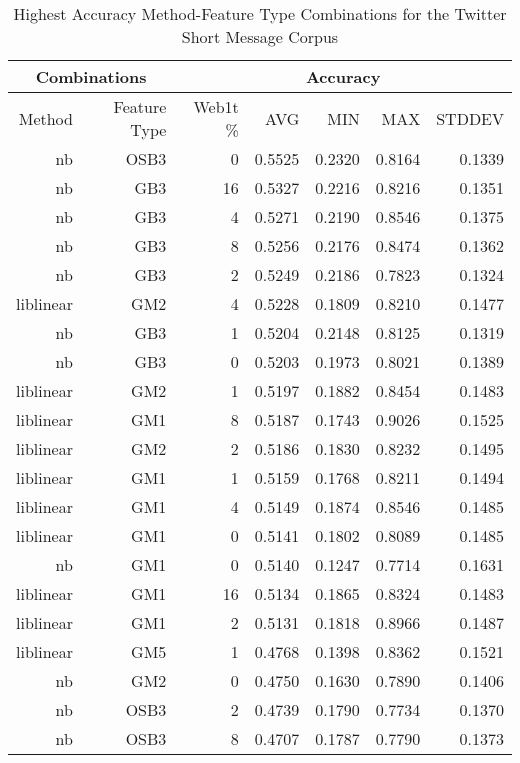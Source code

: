 	
	\begin{table}[htbp!]
	\begin{center}
			\begin{tabular}{ | r | r | r | r | r | r | r | }
			\hline
			\multicolumn{2}{|c|}{Combinations} & \multicolumn{5}{|c|}{Accuracy}\\
			\hline
			Method & Feature Type & Web1t \% & AVG & MIN & MAX & STDDEV\\ \hline 
			nb & OSB3 & 0 & 0.5525 & 0.2320 & 0.8164 & 0.1339\\ \hline 
			nb & GB3 & 16 & 0.5327 & 0.2216 & 0.8216 & 0.1351\\ \hline 
			nb & GB3 & 4 & 0.5271 & 0.2190 & 0.8546 & 0.1375\\ \hline 
			nb & GB3 & 8 & 0.5256 & 0.2176 & 0.8474 & 0.1362\\ \hline 
			nb & GB3 & 2 & 0.5249 & 0.2186 & 0.7823 & 0.1324\\ \hline 
			liblinear & GM2 & 4 & 0.5228 & 0.1809 & 0.8210 & 0.1477\\ \hline 
			nb & GB3 & 1 & 0.5204 & 0.2148 & 0.8125 & 0.1319\\ \hline 
			nb & GB3 & 0 & 0.5203 & 0.1973 & 0.8021 & 0.1389\\ \hline 
			liblinear & GM2 & 1 & 0.5197 & 0.1882 & 0.8454 & 0.1483\\ \hline 
			liblinear & GM1 & 8 & 0.5187 & 0.1743 & 0.9026 & 0.1525\\ \hline 
			liblinear & GM2 & 2 & 0.5186 & 0.1830 & 0.8232 & 0.1495\\ \hline 
			liblinear & GM1 & 1 & 0.5159 & 0.1768 & 0.8211 & 0.1494\\ \hline 
			liblinear & GM1 & 4 & 0.5149 & 0.1874 & 0.8546 & 0.1485\\ \hline 
			liblinear & GM1 & 0 & 0.5141 & 0.1802 & 0.8089 & 0.1485\\ \hline 
			nb & GM1 & 0 & 0.5140 & 0.1247 & 0.7714 & 0.1631\\ \hline 
			liblinear & GM1 & 16 & 0.5134 & 0.1865 & 0.8324 & 0.1483\\ \hline 
			liblinear & GM1 & 2 & 0.5131 & 0.1818 & 0.8966 & 0.1487\\ \hline 
			liblinear & GM5 & 1 & 0.4768 & 0.1398 & 0.8362 & 0.1521\\ \hline 
			nb & GM2 & 0 & 0.4750 & 0.1630 & 0.7890 & 0.1406\\ \hline 
			nb & OSB3 & 2 & 0.4739 & 0.1790 & 0.7734 & 0.1370\\ \hline 
			nb & OSB3 & 8 & 0.4707 & 0.1787 & 0.7790 & 0.1373\\ \hline 

			\end{tabular}
		\caption{Highest Accuracy Method-Feature Type Combinations for the Twitter Short Message Corpus}
		\label{tab:twitter-accuracy-filtered-ranked}
		\end{center}	
	\end{table}
	
